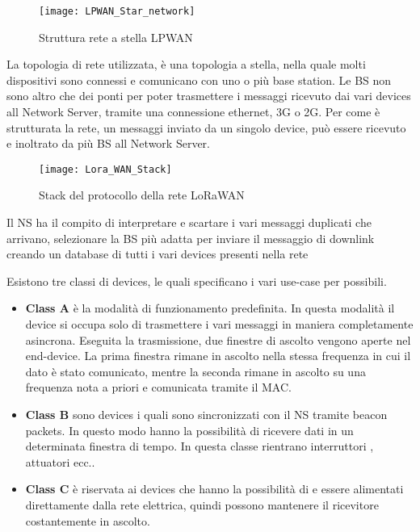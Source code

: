 \begin{figure}[h]
\centering 
\texttt{[image: LPWAN\_Star\_network]}
\caption{Struttura rete a stella LPWAN}
\end{figure}

La topologia di rete utilizzata, è una topologia a stella, nella quale molti
dispositivi sono connessi e comunicano con uno o più base station. Le BS non
sono altro che dei ponti per poter trasmettere i messaggi ricevuto dai vari
devices all Network Server, tramite una connessione ethernet, 3G o 2G. 
Per come è strutturata la rete, un messaggi inviato
da un singolo device, può essere ricevuto e inoltrato da più BS all Network
Server.

\begin{figure}[h]
\centering 
\texttt{[image: Lora\_WAN\_Stack]}
\caption{Stack del protocollo della rete LoRaWAN}
\end{figure}

Il NS ha il compito di interpretare e scartare i vari messaggi duplicati che
arrivano, selezionare la BS più adatta per inviare il messaggio di downlink
creando un database di tutti i vari devices presenti nella rete 


Esistono tre classi di devices, le quali specificano i vari use-case per
possibili.
\begin{itemize}
\item \textbf{Class A} è la modalità di funzionamento predefinita. In questa
modalità il device si occupa solo di trasmettere i vari messaggi in maniera
completamente asincrona. Eseguita la trasmissione, due finestre di ascolto
vengono aperte nel end-device. La prima finestra rimane in ascolto nella stessa
frequenza in cui il dato è stato comunicato, mentre la seconda rimane in ascolto
su una frequenza nota a priori e comunicata tramite il MAC.
\item \textbf{Class B} sono devices i quali sono sincronizzati con il NS tramite
beacon packets. In questo modo hanno la possibilità di ricevere dati in un
determinata finestra di tempo. In questa classe rientrano interruttori ,
attuatori ecc..
\item \textbf{Class C} è riservata ai devices che hanno la possibilità di e
essere alimentati direttamente dalla rete elettrica, quindi possono mantenere il
ricevitore costantemente in ascolto.
\end{itemize}


